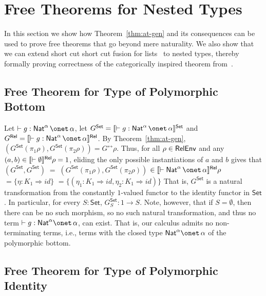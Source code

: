\documentclass{lmcs}
\theoremstyle{plain}\newtheorem{satz}[thm]{Satz}
\newcommand{\set}{\mathsf{Set}}
\renewcommand{\id}{\mathit{id}}
\begin{document}
\section{Free Theorems for Nested Types}\label{sec:ftnt}

In this section we show how Theorem~\ref{thm:at-gen} and its
consequences can be used to prove free theorems that go beyond mere
naturality.  We also show that we can extend short cut short cut
fusion for lists~\cite{glp93} to nested types, thereby formally
proving correctness of the categorically inspired theorem
from~\cite{jg10}.

\subsection{Free Theorem for Type of Polymorphic
  Bottom}\label{sec:bottom} 

Let $ \vdash g : \Nat^\alpha \,\onet\,\alpha$, let $G^\set =
\setsem{\vdash g : \Nat^\alpha \,\onet\,\alpha}$ and $G^\rel =
\relsem{\vdash g : \Nat^\alpha \,\onet\,\alpha}$.  By
Theorem~\ref{thm:at-gen}, $(G^\set(\pi_1\rho),G^\set(\pi_2\rho)) =
G^\rel\rho$. Thus, for all $\rho \in \mathsf{RelEnv}$ and any $(a, b) \in
\llbracket{\vdash \emptyset}\rrbracket^{\mathsf{Rel}}\rho = 1$, eliding the only possible
instantiations of $a$ and $b$ gives that $(G^\set,G^\set) \;= \;
(G^\set(\pi_1 \rho), G^\set (\pi_2 \rho))$ $ \in \relsem{\vdash
  \Nat^\alpha \,\onet\,\alpha}\rho$ $ = \{\eta : K_1 \Rightarrow
\id\}$ $ = \{(\eta_1 : K_1 \Rightarrow \id, \eta_2 : K_1 \Rightarrow
\id)\}$ That is, $G^\set$ is a natural transformation from the
constantly $1$-valued functor to the identity functor in $\set$. In
particular, for every $S : \set$, $G^\set_S : 1 \to S$. Note, however,
that if $S = \emptyset$, then there can be no such morphism, so no
such natural transformation, and thus no term $\vdash g : \Nat^\alpha
\onet \,\alpha$, can exist.  That is, our calculus admits no
non-terminating terms, i.e., terms with the closed type $\Nat^\alpha
\onet \,\alpha$ of the polymorphic bottom.

\subsection{Free Theorem for Type of Polymorphic
  Identity}\label{sec:identity} 
\end{document}

